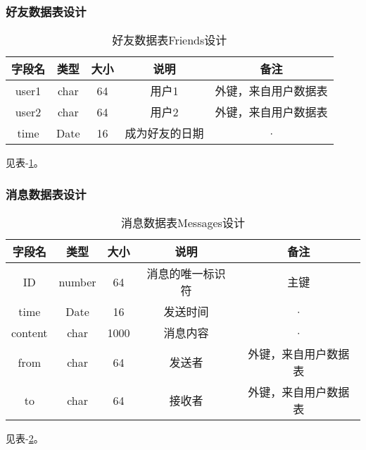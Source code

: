 \subsubsection{好友数据表设计}
\begin{table}[htbp]
	\centering
	\caption{好友数据表Friends设计} \label{tab:friend-database}
	\begin{tabular}{|c|c|c|c|c|}
		\hline
		字段名 & 类型 & 大小 & 说明           & 备注                 \\
		\hline
		user1  & char & 64   & 用户1          & 外键，来自用户数据表 \\
		\hline
		user2  & char & 64   & 用户2          & 外键，来自用户数据表 \\
		\hline
		time   & Date & 16   & 成为好友的日期 & ·                    \\
		\hline
	\end{tabular}
\end{table}
见表-\ref{tab:friend-database}。

\subsubsection{消息数据表设计}
\begin{table}[htbp]
	\centering
	\caption{消息数据表Messages设计} \label{tab:message-database}
	\begin{tabular}{|c|c|c|c|c|}
		\hline
		字段名  & 类型 & 大小 & 说明             & 备注                 \\
		\hline
		ID      & number & 64   & 消息的唯一标识符 & 主键                 \\
		\hline
		time    & Date & 16   & 发送时间         & ·                    \\
		\hline
		content & char & 1000 & 消息内容         & ·                    \\
		\hline
		from    & char & 64   & 发送者           & 外键，来自用户数据表 \\
		\hline
		to      & char & 64   & 接收者           & 外键，来自用户数据表 \\
		\hline
	\end{tabular}
\end{table}
见表-\ref{tab:message-database}。

